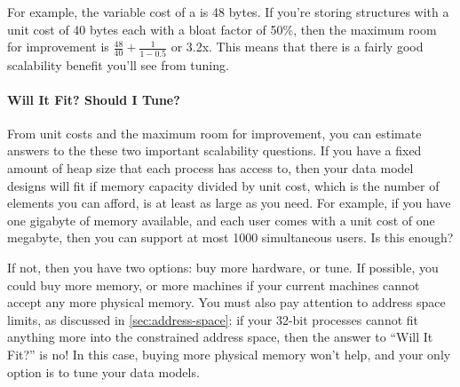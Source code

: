 For example, the variable cost of a  is 48 bytes. If you're
storing structures with a unit cost of 40 bytes each with a bloat factor of
50\%, then the maximum room for improvement is $\frac{48}{40} + \frac{1}{1-0.5}$
or 3.2x. This means that there is a fairly good scalability benefit you'll see from
tuning.


\paragraph{Will It Fit? Should I Tune?}

From unit costs and the maximum room for improvement, you can estimate answers
to the these two important scalability questions. If you have a fixed amount of heap
size that each process has access to, then your data model designs will fit if
memory capacity divided by unit cost, which is the number of elements you can
afford, is at least as large as you need. For example, if you have one gigabyte
of memory available, and each user comes with a unit cost of one megabyte, then
you can support at most 1000 simultaneous users. Is this enough? 

If not, then you have two options: buy more hardware, or tune. If possible, you
could buy more memory, or more machines if your current machines cannot accept
any more physical memory. You must also pay attention to address space limits,
as discussed in \autoref{sec:address-space}: if your 32-bit processes cannot fit
anything more into the constrained address space, then the answer to ``Will It
Fit?'' is no! In this case, buying more physical memory won't help, and your only
option is to tune your data models.

\begin{figure}
\end{figure}

